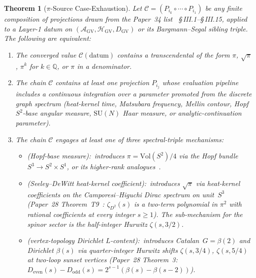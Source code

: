 \documentclass[11pt]{article}
\newtheorem{theorem}{Theorem}
\begin{document}
\begin{theorem}[$\pi$-Source Case-Exhaustion]
\label{thm:pi_source_case_exhaustion}
Let $\mathcal{C} = (P_{i_k} \circ \cdots \circ P_{i_1})$ be any finite
composition of projections drawn from the Paper~34 list~\cite{paper34}
\S\,III.1--\S\,III.15, applied to a Layer-1 datum on
$(\mathcal{A}_{\mathrm{GV}}, \mathcal{H}_{\mathrm{GV}},
D_{\mathrm{GV}})$ or its Bargmann--Segal sibling triple.  The
following are equivalent:
\begin{enumerate}
\setlength\itemsep{0pt}
\item[(i)] The converged value $\mathcal{C}(\mathrm{datum})$ contains a
transcendental of the form $\pi$, $\sqrt{\pi}$, $\pi^k$ for $k \in
\mathbb{Q}$, or $\pi$ in a denominator.
\item[(ii)] The chain $\mathcal{C}$ contains at least one projection
$P_{i_j}$ whose evaluation pipeline includes a continuous integration
over a parameter promoted from the discrete graph spectrum
(heat-kernel time, Matsubara frequency, Mellin contour, Hopf $S^2$-base
angular measure, $\mathrm{SU}(N)$ Haar measure, or
analytic-continuation parameter).
\item[(iii)] The chain $\mathcal{C}$ engages at least one of three
spectral-triple mechanisms:
\begin{itemize}\setlength\itemsep{0pt}
\item[\textbf{M1}] (Hopf-base measure):\ introduces $\pi =
\mathrm{Vol}(S^2)/4$ via the Hopf bundle $S^3 \to S^2 \times S^1$,
or its higher-rank analogues~\cite{paper25,paper30}.
\item[\textbf{M2}] (Seeley--DeWitt heat-kernel coefficient):\
introduces $\sqrt{\pi}$ via heat-kernel coefficients on the
Camporesi--Higuchi Dirac spectrum on unit~$S^3$ (Paper~28
Theorem~T9~\cite{paper28}: $\zeta_{D^2}(s)$ is a two-term polynomial
in $\pi^2$ with rational coefficients at every integer $s \ge 1$).
The sub-mechanism for the spinor sector is the half-integer Hurwitz
$\zeta(s, 3/2)$.
\item[\textbf{M3}] (vertex-topology Dirichlet $L$-content):\
introduces Catalan~$G = \beta(2)$ and Dirichlet $\beta(s)$ via
quarter-integer Hurwitz shifts $\zeta(s, 3/4)$, $\zeta(s, 5/4)$ at
two-loop sunset vertices (Paper~28 Theorem~3:\
$D_{\mathrm{even}}(s) - D_{\mathrm{odd}}(s) = 2^{s-1}(\beta(s) -
\beta(s-2))$).
\end{itemize}
\end{enumerate}
\end{theorem}
\end{document}
